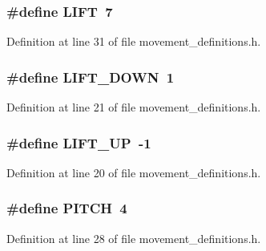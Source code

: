 \subsubsection[{\-L\-I\-F\-T}]{\setlength{\rightskip}{0pt plus 5cm}\#define {\bf \-L\-I\-F\-T}~7}\label{movement__definitions_8h_a87c4281ab0288154c50e55e63f1b5dce}


\-Definition at line 31 of file movement\-\_\-definitions.\-h.

\subsubsection[{\-L\-I\-F\-T\-\_\-\-D\-O\-W\-N}]{\setlength{\rightskip}{0pt plus 5cm}\#define {\bf \-L\-I\-F\-T\-\_\-\-D\-O\-W\-N}~1}\label{movement__definitions_8h_a9aca61b9fb843d370108b53f4058be83}


\-Definition at line 21 of file movement\-\_\-definitions.\-h.

\subsubsection[{\-L\-I\-F\-T\-\_\-\-U\-P}]{\setlength{\rightskip}{0pt plus 5cm}\#define {\bf \-L\-I\-F\-T\-\_\-\-U\-P}~-\/1}\label{movement__definitions_8h_ab1d03fc5bf15953f64274b0bd0648242}


\-Definition at line 20 of file movement\-\_\-definitions.\-h.

\subsubsection[{\-P\-I\-T\-C\-H}]{\setlength{\rightskip}{0pt plus 5cm}\#define {\bf \-P\-I\-T\-C\-H}~4}\label{movement__definitions_8h_acd633835a520a62245ec6cfeb6d00e97}


\-Definition at line 28 of file movement\-\_\-definitions.\-h.

